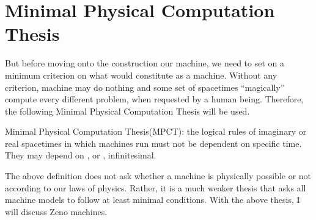 \documentclass{roffin}
\begin{document}
\section{Minimal Physical Computation Thesis}
But before moving onto the construction our machine, we need to set on a minimum criterion on what would constitute as a machine. Without any criterion, machine  may do nothing and some set of spacetimes ``magically'' compute every different problem, when requested by a human being. Therefore, the following Minimal Physical Computation Thesis will be used.
\begin{definition}
Minimal Physical Computation Thesis(MPCT): the logical rules of imaginary or real spacetimes in which machines run must not be dependent on specific time. They may depend on , or , infinitesimal. 
\end{definition}
The above definition does not ask whether a machine is physically possible or not according to our laws of physics. Rather, it is a much weaker thesis that asks all machine models to follow at least minimal conditions. With the above thesis, I will discuss Zeno machines.
\end{document}
